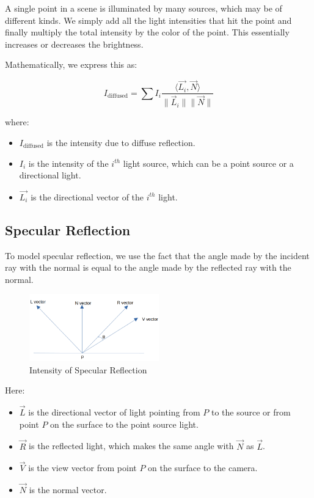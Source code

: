 \documentclass{article}
\begin{document}
A single point in a scene is illuminated by many sources, which may be of different kinds. We simply add all the light intensities that hit the point and finally multiply the total intensity by the color of the point. This essentially increases or decreases the brightness.

Mathematically, we express this as:

\[I_{\text{diffused}} = \sum I_i \frac{\langle \vec{L_i}, \vec{N} \rangle}{\|\vec{L}_i\| \|\vec{N}\|}\]


where:
\begin{itemize}
    \item $I_{\text{diffused}}$ is the intensity due to diffuse reflection.
    \item $I_i$ is the intensity of the $i^{th}$ light source, which can be a point source or a directional light.
    \item $\vec{L_i}$ is the directional vector of the $i^{th}$ light.
\end{itemize}

\subsection{Specular Reflection}

To model specular reflection, we use the fact that the angle made by the incident ray with the normal is equal to the angle made by the reflected ray with the normal.

\begin{figure}[h]
    \centering
    \includegraphics[width=0.5\textwidth]{./figs/intensityspecular.png}
    \caption{Intensity of Specular Reflection}
\end{figure}

Here:
\begin{itemize}
    \item $\vec{L}$ is the directional vector of light pointing from $P$ to the source or from point $P$ on the surface to the point source light.
    \item $\vec{R}$ is the reflected light, which makes the same angle with $\vec{N}$ as $\vec{L}$.
    \item $\vec{V}$ is the view vector from point $P$ on the surface to the camera.
    \item $\vec{N}$ is the normal vector.
\end{itemize}
\end{document}
